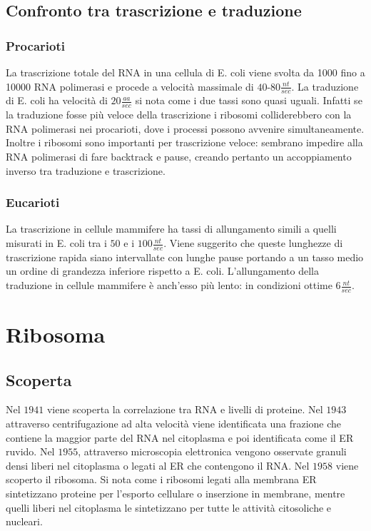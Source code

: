 \subsection{Confronto tra trascrizione e traduzione}
\subsubsection{Procarioti}
La trascrizione totale del RNA in una cellula di E. coli viene svolta da \num{1000} fino a \num{10000} RNA polimerasi e procede a velocit\`a massimale di $40$-$80\frac{nt}{sec}$. La traduzione 
di E. coli ha velocit\`a di $20\frac{aa}{sec}$ si nota come i due tassi sono quasi uguali. Infatti se la traduzione fosse pi\`u veloce della trascrizione i ribosomi colliderebbero con la RNA polimerasi 
nei procarioti, dove i processi possono avvenire simultaneamente. Inoltre i ribosomi sono importanti per trascrizione veloce: sembrano impedire alla RNA polimerasi di fare backtrack e pause, creando
pertanto un accoppiamento inverso tra traduzione e trascrizione. 
\subsubsection{Eucarioti}
La trascrizione in cellule mammifere ha tassi di allungamento simili a quelli misurati in E. coli tra i $50$ e i $100\frac{nt}{sec}$. Viene suggerito che queste lunghezze di trascrizione rapida siano
intervallate con lunghe pause portando a un tasso medio un ordine di grandezza inferiore rispetto a E. coli. L'allungamento della traduzione in cellule mammifere \`e anch'esso pi\`u lento: in condizioni
ottime $6\frac{nt}{sec}$. 
\section{Ribosoma}
\subsection{Scoperta}
Nel $1941$ viene scoperta la correlazione tra RNA e livelli di proteine. Nel $1943$ attraverso centrifugazione ad alta velocit\`a viene identificata una frazione che contiene la maggior parte del RNA
nel citoplasma e poi identificata come il ER ruvido. Nel $1955$, attraverso microscopia elettronica vengono osservate granuli densi liberi nel citoplasma o legati al ER che contengono il RNA. Nel
$1958$ viene scoperto il ribosoma. Si nota come i ribosomi legati alla membrana ER sintetizzano proteine per l'esporto cellulare o inserzione in membrane, mentre quelli liberi nel citoplasma le 
sintetizzano per tutte le attivit\`a citosoliche e nucleari. 
